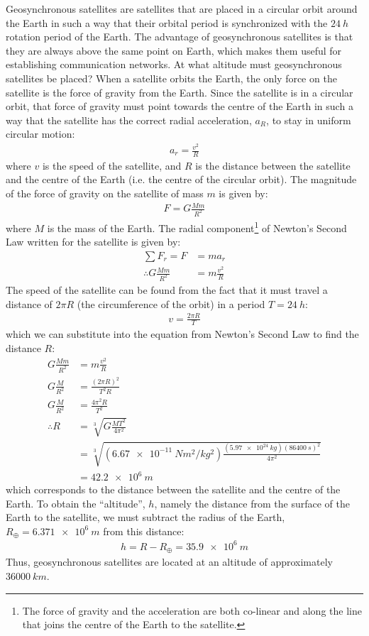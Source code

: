 \begin{example}{\label{ex:gravity:geosyncorbit}Geosynchronous satellites are satellites that are placed in a circular orbit around the Earth in such a way that their orbital period is synchronized with the $\SI{24}{h}$ rotation period of the Earth. The advantage of geosynchronous satellites is that they are always above the same point on Earth, which makes them useful for establishing communication networks. At what altitude must geosynchronous satellites be placed?}
When a satellite orbits the Earth, the only force on the satellite is the force of gravity from the Earth. Since the satellite is in a circular orbit, that force of gravity must point towards the centre of the Earth in such a way that the satellite has the correct radial acceleration, $a_R$, to stay in uniform circular motion:
\begin{align*}
a_r=\frac{v^2}{R}
\end{align*}
where $v$ is the speed of the satellite, and $R$ is the distance between the satellite and the centre of the Earth (i.e. the centre of the circular orbit). The magnitude of the force of gravity on the satellite of mass $m$ is given by:
\begin{align*}
F = G\frac{Mm}{R^2}
\end{align*}
where $M$ is the mass of the Earth. The radial component\footnote{The force of gravity and the acceleration are both co-linear and along the line that joins the centre of the Earth to the satellite.} of Newton's Second Law written for the satellite is given by:
\begin{align*}
\sum F_r = F &= ma_r\\
\therefore G\frac{Mm}{R^2}&=m\frac{v^2}{R}
\end{align*}
The speed of the satellite can be found from the fact that it must travel a distance of $2\pi R$ (the circumference of the orbit) in a period $T=\SI{24}{h}$:
\begin{align*}
v=\frac{2\pi R}{T}
\end{align*}
which we can substitute into the equation from Newton's Second Law to find the distance $R$:
\begin{align*}
G\frac{Mm}{R^2}&=m\frac{v^2}{R}\\
G\frac{M}{R^2}&=\frac{(2\pi R)^2}{T^2R}\\ 
G\frac{M}{R^2}&=\frac{4\pi^2 R}{T^2}\\ 
\therefore R&=\sqrt[3]{G\frac{MT^2}{4\pi^2}}\\
&=\sqrt[3]{(\SI{6.67e-11}{Nm^2/kg^2})\frac{(\SI{5.97e24}{kg})(\SI{86400}{s})^2}{4\pi^2}}\\
&=\SI{42.2e6}{m}
\end{align*}
which corresponds to the distance between the satellite and the centre of the Earth. To obtain the ``altitude'', $h$, namely the distance from the surface of the Earth to the satellite, we must subtract the radius of the Earth, $R_\oplus=\SI{6.371e6}{m}$ from this distance:
\begin{align*}
h = R-R_\oplus = \SI{35.9e6}{m}
\end{align*}
Thus, geosynchronous satellites are located at an altitude of approximately $\SI{36000}{km}$.
\end{example}

